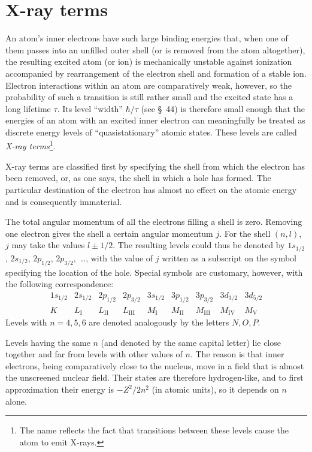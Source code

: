 \section{X-ray terms}

An atom's inner electrons have such large binding energies that, when one of them passes into an unfilled outer shell (or is removed from the atom altogether), the resulting excited atom (or ion) is mechanically unstable against ionization accompanied by rearrangement of the electron shell and formation of a stable ion. Electron interactions within an atom are comparatively weak, however, so the probability of such a transition is still rather small and the excited state has a long lifetime $\tau$. Its level ``width'' $\hbar/\tau$ (see \S~44) is therefore small enough that the energies of an atom with an excited inner electron can meaningfully be treated as discrete energy levels of ``quasistationary'' atomic states. These levels are called \emph{X-ray terms}\footnote{The name reflects the fact that transitions between these levels cause the atom to emit X-rays.}.

X-ray terms are classified first by specifying the shell from which the electron has been removed, or, as one says, the shell in which a hole has formed. The particular destination of the electron has almost no effect on the atomic energy and is consequently immaterial.

The total angular momentum of all the electrons filling a shell is zero. Removing one electron gives the shell a certain angular momentum $j$. For the shell $(n,l)$, $j$ may take the values $l\pm1/2$. The resulting levels could thus be denoted by $1s_{1/2}$, $2s_{1/2}$, $2p_{1/2}$, $2p_{3/2}$,~\ldots, with the value of $j$ written as a subscript on the symbol specifying the location of the hole. Special symbols are customary, however, with the following correspondence:
\[
\begin{array}{ccccccccc}
1s_{1/2}&2s_{1/2}&2p_{1/2}&2p_{3/2}&3s_{1/2}&3p_{1/2}&3p_{3/2}&3d_{3/2}&3d_{5/2}\\
K&L_{\mathrm I}&L_{\mathrm{II}}&L_{\mathrm{III}}&M_{\mathrm I}&M_{\mathrm{II}}&M_{\mathrm{III}}&M_{\mathrm{IV}}&M_{\mathrm V}
\end{array}
\]
Levels with $n=4,5,6$ are denoted analogously by the letters $N,O,P$.

Levels having the same $n$ (and denoted by the same capital letter) lie close together and far from levels with other values of $n$. The reason is that inner electrons, being comparatively close to the nucleus, move in a field that is almost the unscreened nuclear field. Their states are therefore hydrogen-like, and to first approximation their energy is $-Z^2/2n^2$ (in atomic units), so it depends on $n$ alone.
